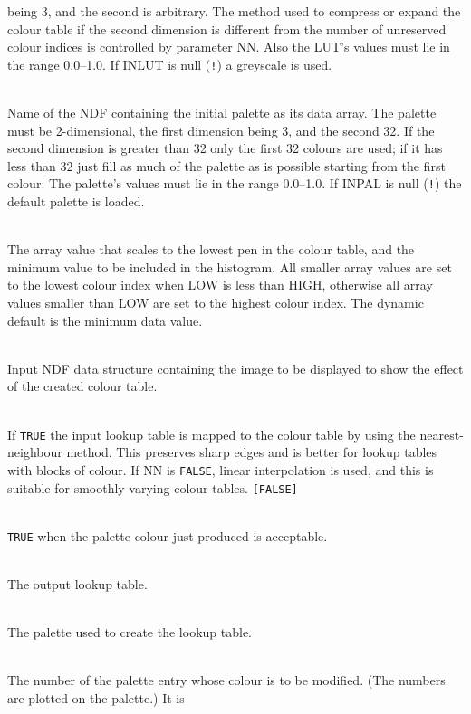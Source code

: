 \documentclass[twoside,11pt]{article}
\newcommand{\sstsubsection}[1]{ \item[{#1}] \mbox{} \\}
\newcommand{\sstsubsection}[1]{\item[{#1}]}
\begin{document}
{{{         being 3, and the second is arbitrary.  The method used to
         compress or expand the colour table if the second dimension is
         different from the number of unreserved colour indices is
         controlled by parameter NN.  Also the LUT's values must lie in
         the range 0.0--1.0.  If INLUT is null ({\tt !}) a
         greyscale is used.
      }
      \sstsubsection{
         INPAL = NDF (Read)
      }{
         Name of the NDF containing the initial palette as its data
         array.  The palette must be 2-dimensional, the first dimension
         being 3, and the second 32.  If the second dimension is
         greater than 32 only the first 32 colours are used; if it has
         less than 32 just fill as much of the palette as is possible
         starting from the first colour.  The palette's values must lie
         in the range 0.0--1.0.  If INPAL is null ({\tt !}) the default
         palette is loaded.
      }
      \sstsubsection{
         LOW = \_DOUBLE (Read)
      }{
         The array value that scales to the lowest pen in the colour
         table, and the minimum value to be included in the histogram.
         All smaller array values are set to the lowest colour
         index when LOW is less than HIGH, otherwise all array values
         smaller than LOW are set to the highest colour index.   The
         dynamic default is the minimum data value.
      }
      \sstsubsection{
         NDF = NDF (Read)
      }{
         Input NDF data structure containing the image to be displayed
         to show the effect of the created colour table.
      }
      \sstsubsection{
         NN = \_LOGICAL (Read)
      }{
         If {\tt TRUE} the input lookup table is mapped to the colour table by
         using the nearest-neighbour method.  This preserves sharp
         edges and is better for lookup tables with blocks of colour.
         If NN is {\tt FALSE}, linear interpolation is used, and this is
         suitable for smoothly varying colour tables. {\tt [FALSE]}
      }
      \sstsubsection{
         OK = \_LOGICAL (Read)
      }{
         {\tt TRUE} when the palette colour just produced is acceptable.
      }
      \sstsubsection{
         OUTLUT = NDF (Write)
      }{
         The output lookup table.
      }
      \sstsubsection{
         OUTPAL = NDF (Write)
      }{
         The palette used to create the lookup table.
      }
      \sstsubsection{
         PALNUM = \_INTEGER (Read)
      }{
         The number of the palette entry whose colour is to be
         modified.  (The numbers are plotted on the palette.) It is
}}}
\end{document}
